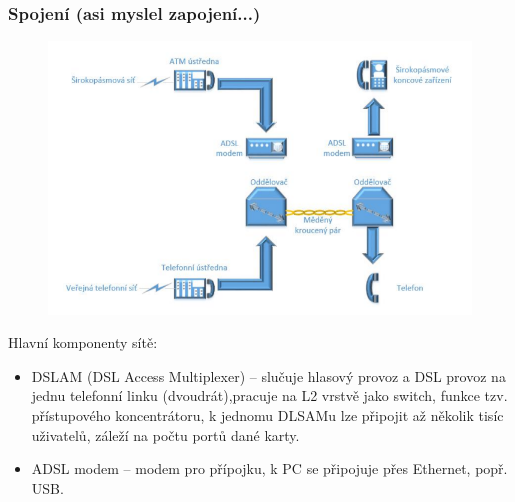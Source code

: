 \subsubsection{Spojení (asi myslel zapojení...)}
\begin{figure} [h]
    \centering
    \includegraphics[scale=0.8]{snimky/zapoj.png}
\end{figure}

Hlavní komponenty sítě:
\begin{itemize}
    \item DSLAM (DSL Access Multiplexer) -- slučuje hlasový provoz a DSL provoz na jednu telefonní linku (dvoudrát),pracuje na L2 vrstvě jako switch, funkce tzv. přístupového koncentrátoru, k jednomu DLSAMu lze připojit až několik tisíc uživatelů, záleží na počtu portů dané karty.
    \item ADSL modem -- modem pro přípojku, k PC se připojuje přes Ethernet, popř. USB.
\end{itemize}

